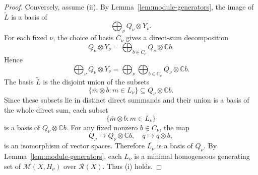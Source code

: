 \documentclass[11pt]{article}
\newcommand{\dsC}{\mathbb{C}}
\newcommand{\scM}{\mathcal{M}}
\newcommand{\scR}{\mathcal{R}}
\theoremstyle{definition}
\begin{document}
\begin{proof}
  Conversely, assume \textup{(ii)}. By Lemma~\ref{lem:module-generators}, the image of $\widetilde L$ is a basis of
  \[
    \bigoplus_{\nu} Q_\nu\otimes Y_\nu.
  \]
  For each fixed $\nu$, the choice of basis $C_\nu$ gives a direct-sum decomposition
  \[
    Q_\nu\otimes Y_\nu
    =
    \bigoplus_{b\in C_\nu} Q_\nu\otimes \dsC b.
  \]
  Hence
  \[
    \bigoplus_{\nu} Q_\nu\otimes Y_\nu
    =
    \bigoplus_{\nu}\bigoplus_{b\in C_\nu} Q_\nu\otimes \dsC b.
  \]
  The basis $\widetilde L$ is the disjoint union of the subsets
  \[
    \{\overline{m}\otimes b : m\in L_\nu\}
    \subseteq
    Q_\nu\otimes \dsC b.
  \]
  Since these subsets lie in distinct direct summands and their union is a basis of the whole direct sum, each subset
  \[
    \{\overline{m}\otimes b : m\in L_\nu\}
  \]
  is a basis of $Q_\nu\otimes \dsC b$. For any fixed nonzero $b\in C_\nu$, the map
  \[
    Q_\nu \longrightarrow Q_\nu\otimes \dsC b,
    \quad
    q\longmapsto q\otimes b,
  \]
  is an isomorphism of vector spaces. Therefore $\overline{L_\nu}$ is a basis of $Q_\nu$. By Lemma~\ref{lem:module-generators}, each $L_\nu$ is a minimal homogeneous generating set of $\scM(X,H_\nu)$ over $\scR(X)$. Thus \textup{(i)} holds.
\end{proof}
\end{document}
